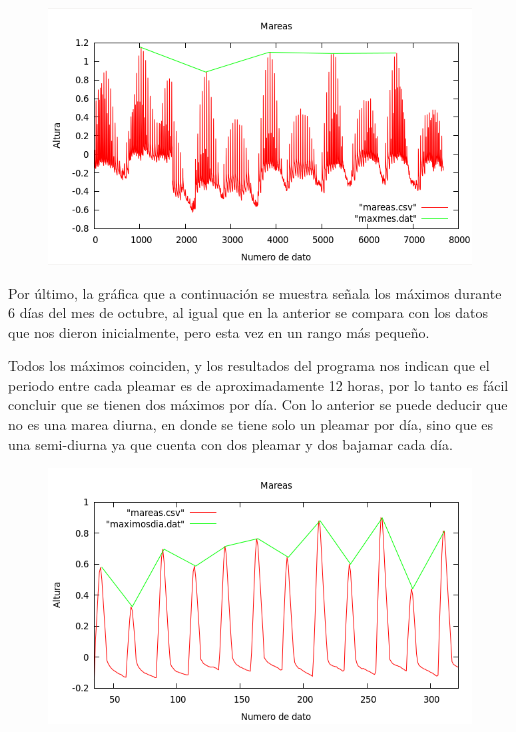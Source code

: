 \begin{figure}[ht]
\includegraphics[width=11 cm]{maxmes.png}
\end{figure}

Por último, la gráfica que a continuación se muestra señala los máximos durante 6 días del mes de octubre, al igual que en la anterior se compara con los datos que nos dieron inicialmente, pero esta vez en un rango más pequeño. 

Todos los máximos coinciden, y los resultados del programa nos  indican que el periodo entre cada pleamar es de aproximadamente 12 horas, por lo tanto es fácil concluir que se tienen dos máximos por día. Con lo anterior se puede deducir que no es una marea diurna, en donde se tiene solo un pleamar por día, sino que es una semi-diurna ya que cuenta con dos pleamar y dos bajamar cada día. 

\begin{figure}[ht]
\includegraphics[width=11 cm]{maxdia.png}
\end{figure}


